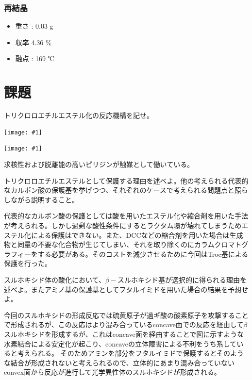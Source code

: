\documentclass[a4paper,papersize,dvipdfmx]{jsarticle}
\newcommand{\pict}[2]{\begin{center} \texttt{[image: \#1]} \end{center}}   %
\begin{document}
\subsubsection*{再結晶}
\begin{itemize}
\item 重さ : 0.03 g
\item 収率 4.36 \%
\item 融点 : 169 ℃

\end{itemize}


\section*{課題}

\begin{tcolorbox}[colback=white,colbacktitle=black,coltitle=white,title={1-a.}]
トリクロロエチルエステル化の反応機構を記せ。
\end{tcolorbox}

\pict{imgs-k/hk1.jpeg}{10}
\pict{imgs-k/hk2.jpeg}{10}
求核性および脱離能の高いピリジンが触媒として働いている。

\begin{tcolorbox}[colback=white,colbacktitle=black,coltitle=white,title={1-b.}]
トリクロロエチルエステルとして保護する理由を述べよ。他の考えられる代表的なカルボン酸の保護基を挙げつつ、それぞれのケースで考えられる問題点と照らしながら説明すること。
\end{tcolorbox}

代表的なカルボン酸の保護としては酸を用いたエステル化や縮合剤を用いた手法が考えられる。しかし過剰な酸性条件にするとラクタム環が壊れてしまうためエステル化による保護はできない。また、DCCなどの縮合剤を用いた場合は生成物と同量の不要な化合物が生じてしまい、それを取り除くのにカラムクロマトグラフィーをする必要がある。そのコストを減少させるために今回はTroc基による保護を行った。

\begin{tcolorbox}[colback=white,colbacktitle=black,coltitle=white,title={1-c.}]
スルホキシド体の酸化において、$\beta -$スルホキシド基が選択的に得られる理由を述べよ。またアミノ基の保護基としてフタルイミドを用いた場合の結果を予想せよ。
\end{tcolorbox}


今回のスルホキシドの形成反応では硫黄原子が過ギ酸の酸素原子を攻撃することで形成されるが、この反応はより混み合っているconcave面での反応を経由して$\beta$スルホキシドを形成するが、これはconcave面を経由することで図に示すような水素結合による安定化が起こり、concaveの立体障害による不利をうち系していると考えられる。
そのためアミンを部分をフタルイミドで保護するとそのような結合が形成されないと考えられるので、立体的にあまり混み合っていないconvex面から反応が進行して光学異性体のスルホキシドが形成される。
\end{document}
